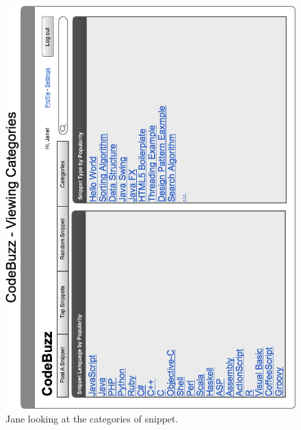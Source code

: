 \documentclass{sig-alt-release2}
\begin{document}
\begin{figure}
\includegraphics[width=\textwidth]{../imgs/viewingCategoriesHorz.png}
\caption{Jane looking at the categories of snippet.}
\label{fig:viewCategories}
\end{figure}
\end{document}
